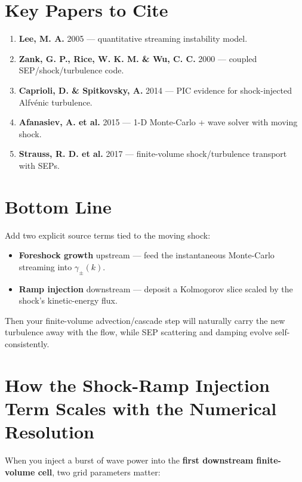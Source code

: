 \section*{Key Papers to Cite}

\begin{enumerate}
\item \textbf{Lee, M. A.} 2005 — quantitative streaming instability model.
\item \textbf{Zank, G. P., Rice, W. K. M. \& Wu, C. C.} 2000 — coupled SEP/shock/turbulence code.
\item \textbf{Caprioli, D. \& Spitkovsky, A.} 2014 — PIC evidence for shock-injected Alfvénic turbulence.
\item \textbf{Afanasiev, A. et al.} 2015 — 1-D Monte-Carlo + wave solver with moving shock.
\item \textbf{Strauss, R. D. et al.} 2017 — finite-volume shock/turbulence transport with SEPs.
\end{enumerate}

\section*{Bottom Line}

\noindent
Add two explicit source terms tied to the moving shock:
\begin{itemize}
\item \textbf{Foreshock growth} upstream — feed the instantaneous Monte-Carlo streaming into $\gamma_\pm(k)$.
\item \textbf{Ramp injection} downstream — deposit a Kolmogorov slice scaled by the shock’s kinetic-energy flux.
\end{itemize}

\noindent
Then your finite-volume advection/cascade step will naturally carry the new turbulence away with the flow, while SEP scattering and damping evolve self-consistently.



\section*{How the \textbf{Shock-Ramp Injection Term} Scales with the \textbf{Numerical Resolution}}

When you inject a burst of wave power into the \textbf{first downstream finite-volume cell}, two grid parameters matter:

